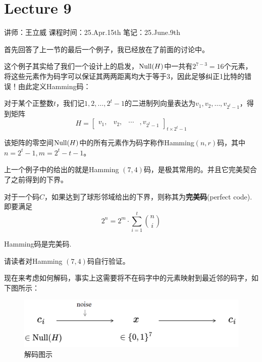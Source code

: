 \chapter{Lecture 9}

\begin{center}
    讲师：王立威 \qquad
    课程时间：25.Apr.15th \qquad 
    笔记：25.June.9th
\end{center}

\bigskip

首先回答了上一节的最后一个例子，我已经放在了前面的讨论中。

这个例子其实给了我们一个设计上的启发，$\operatorname*{Null}(H)$中一共有$2^{7-3}=16$个元素，将这些元素作为码字可以保证其两两距离均大于等于$3$，因此足够纠正1比特的错误！由此定义Hamming码： 

\begin{definition}[Hamming $(n,m)$码]
    对于某个正整数$t$，我们记$1, 2, \dots, 2^t-1$的二进制列向量表达为$v_1, v_2, \dots, v_{2^t-1}$，得到矩阵 
    \[
H = \begin{bmatrix}
    v_1, & v_2, & \cdots & ,v_{2^t-1}
\end{bmatrix}_{t \times 2^t-1}
    \]

    该矩阵的零空间$\operatorname*{Null}(H)$中的所有元素作为码字称作Hamming$(n,r)$码，其中$n=2^t-1, m=2^t-t-1$。
\end{definition}

上一个例子中的给出的就是Hamming $(7,4)$码，是极其常用的。并且它完美契合了之前得到的下界。 
\begin{definition}[完美码]
    对于一个码$C$，如果达到了球形邻域给出的下界，则称其为\textbf{完美码}(perfect code). 即要满足 
    \[
        2^n = 2^m \cdot \sum_{i=1}^t \binom{n}{i}
    \]
\end{definition}
\begin{theorem}
    Hamming码是完美码.
\end{theorem}
\begin{solution}
    请读者对Hamming $(7,4)$码自行验证。
\end{solution}

现在来考虑如何解码，事实上这需要将不在码字中的元素映射到最近邻的码字，如下图所示：
\begin{figure}[H]
    \centering
    \includegraphics[width=.8\textwidth]{images/c9_1.png}
    \caption{解码图示}
\end{figure}

